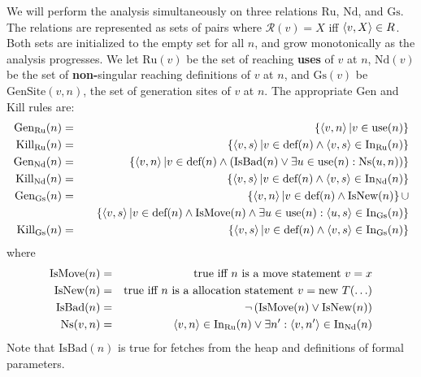 \documentclass[11pt,notitlepage]{article}
\begin{document}
We will perform the analysis simultaneously on three relations
$\text{Ru}$, $\text{Nd}$, and $\text{Gs}$.
The relations are represented as
sets of pairs  where
$\mathcal{R}(v)=X$ iff $\left\langle v,X \right\rangle \in R$.
Both sets are initialized
to the empty set for all $n$, and grow monotonically as the analysis
progresses.
We let
$\text{Ru}(v)$ be the set of reaching \textbf{uses} of $v$ at $n$,
$\text{Nd}(v)$ be the set of \textbf{non-}singular reaching definitions
of $v$ at $n$,
 and
$\text{Gs}(v)$ be $\text{GenSite}(v,n)$, the set of generation sites
of $v$ at $n$.
The appropriate Gen and Kill rules are:
\begin{eqnarray*}
\text{Gen}_\text{Ru}(n) &=&
        \left\{ \tuple{v, n} | v \in \text{use}(n) \right\} \\
\text{Kill}_\text{Ru}(n) &=&
        \left\{ \tuple{v, s} | v \in \text{def}(n) \wedge
                          \tuple{v,s} \in \text{In}_\text{Ru}(n) \right\} \\
%
\text{Gen}_\text{Nd}(n) &=&
        \left\{ \tuple{v, n} | v \in \text{def}(n) \wedge
\left( \text{IsBad}(n) \vee
\exists u\in\text{use}(n):\text{Ns}(u,n)
 \right) \right\}
\\
\text{Kill}_\text{Nd}(n) &=&
        \left\{ \tuple{v, s} | v \in \text{def}(n) \wedge
                          \tuple{v,s} \in \text{In}_\text{Nd}(n) \right\} \\
\text{Gen}_\text{Gs}(n) &=&
       \left\{ \tuple{v, n} | v \in \text{def}(n)\wedge\text{IsNew}(n)\right\}
       \cup\\&&\quad
       \left\{ \tuple{v, s} | v \in \text{def}(n)\wedge\text{IsMove}(n) \wedge
                              \exists u\in\text{use}(n) :
                                 \tuple{u,s}\in \text{In}_\text{Gs}(n)\right\}
\\
\text{Kill}_\text{Gs}(n) &=&
       \left\{ \tuple{v, s} | v \in \text{def}(n) \wedge
                         \tuple{v,s} \in \text{In}_\text{Gs}(n) \right\} %
\end{eqnarray*}
where
\begin{eqnarray*}
\text{IsMove}(n) &=& \text{true iff }n\text{ is a move statement } v=x\\
\text{IsNew}(n) &=& \text{true iff }n\text{ is a allocation statement } v=\text{new }T(\ldots)\\
\text{IsBad}(n) &=& \neg\left(\text{IsMove}(n) \vee \text{IsNew}(n)\right) \\
\text{Ns}(v,n) &=&
\left\langle v,n \right\rangle \in \text{In}_\text{Ru}(n) \vee
\exists n': \left\langle v,n' \right\rangle\in\text{In}_\text{Nd}(n)
\end{eqnarray*}
Note that $\text{IsBad}(n)$ is true for fetches from the heap and
definitions of formal parameters.
\end{document}
